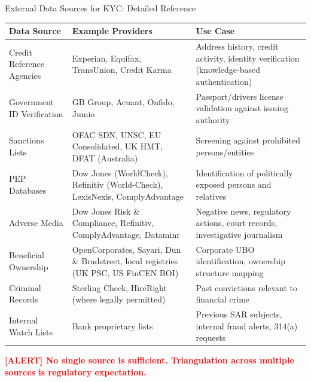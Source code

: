 \documentclass[11pt,a4paper]{beamer}
\newcommand{\redflag}[1]{\textcolor{red}{\textbf{[ALERT] #1}}}
\begin{document}
\begin{frame}{External Data Sources for KYC: Detailed Reference}
	\begin{longtable}{p{}|p{}|p{}}
		\hline
		\rowcolor{lightgray}
		\textbf{Data Source} & \textbf{Example Providers} & \textbf{Use Case} \\
		\hline
		Credit Reference Agencies & Experian, Equifax, TransUnion, Credit Karma & Address history, credit activity, identity verification (knowledge-based authentication) \\
		\hline
		Government ID Verification & GB Group, Acuant, Onfido, Jumio & Passport/drivers license validation against issuing authority \\
		\hline
		Sanctions Lists & OFAC SDN, UNSC, EU Consolidated, UK HMT, DFAT (Australia) & Screening against prohibited persons/entities \\
		\hline
		PEP Databases & Dow Jones (WorldCheck), Refinitiv (World-Check), LexisNexis, ComplyAdvantage & Identification of politically exposed persons and relatives \\
		\hline
		Adverse Media & Dow Jones Risk \& Compliance, Refinitiv, ComplyAdvantage, Dataminr & Negative news, regulatory actions, court records, investigative journalism \\
		\hline
		Beneficial Ownership & OpenCorporates, Sayari, Dun \& Bradstreet, local registries (UK PSC, US FinCEN BOI) & Corporate UBO identification, ownership structure mapping \\
		\hline
		Criminal Records & Sterling Check, HireRight (where legally permitted) & Past convictions relevant to financial crime \\
		\hline
		Internal Watch Lists & Bank proprietary lists & Previous SAR subjects, internal fraud alerts, 314(a) requests \\
		\hline
	\end{longtable}
	\redflag{No single source is sufficient. Triangulation across multiple sources is regulatory expectation.}
\end{frame}
\end{document}
